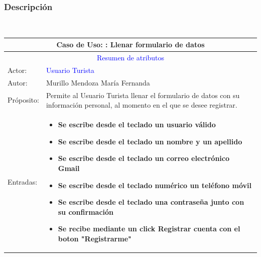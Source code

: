 \subsubsection{Descripción} \\
            \begin{tabularx}{16cm}{||l|X||}
            	\hline
            	\multicolumn{2}{||c||}{Caso de Uso: : Llenar formulario de datos} \\
            	\hline
            	\multicolumn{2}{||c||}{\textcolor{blue}{Resumen de atributos}} \\
            	\hline
            	{Actor:} & {\textcolor{blue}{Usuario Turista}} \\
                \hline
                {Autor:} & {Murillo Mendoza María Fernanda} \\
            	\hline
            	{Próposito:} & {Permite al Usuario Turista llenar el formulario de datos con su información personal, al momento en el que se desee registrar.} \\
            	\hline
                 {Entradas:} & { \begin{itemize}
                        \item \textbf {Se escribe desde el teclado un usuario válido}
                        \item \textbf {Se escribe desde el teclado un nombre y un apellido}
                        \item \textbf {Se escribe desde el teclado un correo electrónico Gmail}
                        \item \textbf {Se escribe desde el teclado numérico un teléfono móvil }
                        \item \textbf {Se escribe desde el teclado una contraseña junto con su confirmación}
                        \item \textbf {Se recibe mediante un click Registrar cuenta con el boton "Registrarme"}
                        

\end{itemize}}
\end{tabularx}
